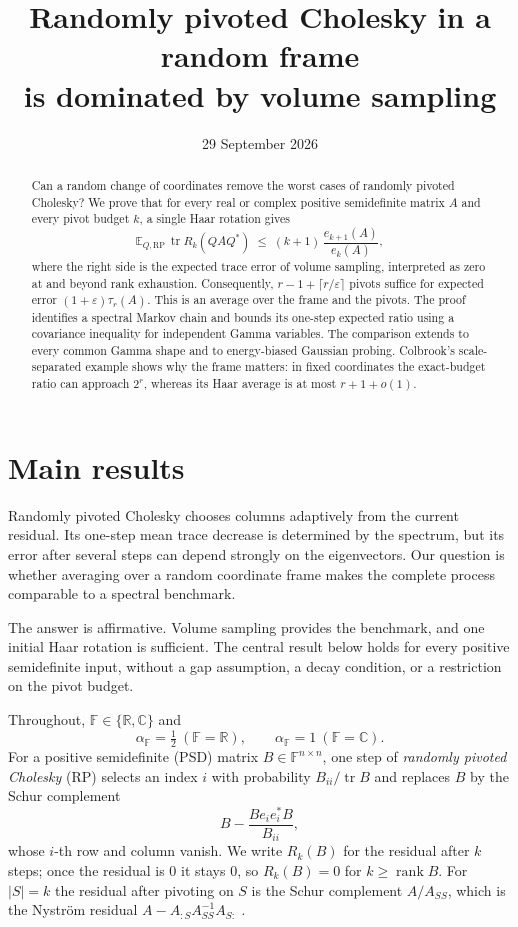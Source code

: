 \documentclass[11pt,a4paper]{article}
\title{Randomly pivoted Cholesky in a random frame\\ is dominated by volume sampling}
\author{}
\date{29 September 2026}
\theoremstyle{definition}
\newcommand{\E}{\mathbb{E}}
\newcommand{\R}{\mathbb{R}}
\newcommand{\C}{\mathbb{C}}
\newcommand{\F}{\mathbb{F}}
\newcommand{\tr}{\operatorname{tr}}
\newcommand{\rank}{\operatorname{rank}}
\newcommand{\RP}{\mathrm{RP}}
\begin{document}
\maketitle

\begin{abstract}
Can a random change of coordinates remove the worst cases of randomly pivoted Cholesky? We prove that for every real or complex positive semidefinite matrix $A$ and every pivot budget $k$, a single Haar rotation gives
\[
\E_{Q,\RP}\,\tr R_k(QAQ^*)\;\le\;(k+1)\,\frac{e_{k+1}(A)}{e_k(A)},
\]
where the right side is the expected trace error of volume sampling, interpreted as zero at and beyond rank exhaustion. Consequently, $r-1+\lceil r/\varepsilon\rceil$ pivots suffice for expected error $(1+\varepsilon)\tau_r(A)$. This is an average over the frame and the pivots. The proof identifies a spectral Markov chain and bounds its one-step expected ratio using a covariance inequality for independent Gamma variables. The comparison extends to every common Gamma shape and to energy-biased Gaussian probing. Colbrook's scale-separated example shows why the frame matters: in fixed coordinates the exact-budget ratio can approach $2^r$, whereas its Haar average is at most $r+1+o(1)$.
\end{abstract}

\tableofcontents
\clearpage
\section{Main results}\label{sec:main}

Randomly pivoted Cholesky chooses columns adaptively from the current residual. Its one-step mean trace decrease is determined by the spectrum, but its error after several steps can depend strongly on the eigenvectors. Our question is whether averaging over a random coordinate frame makes the complete process comparable to a spectral benchmark.

The answer is affirmative. Volume sampling provides the benchmark, and one initial Haar rotation is sufficient. The central result below holds for every positive semidefinite input, without a gap assumption, a decay condition, or a restriction on the pivot budget.

Throughout, $\F\in\{\R,\C\}$ and
\[
\alpha_\F=\tfrac12\ (\F=\R),\qquad \alpha_\F=1\ (\F=\C).
\]
For a positive semidefinite (PSD) matrix $B\in\F^{n\times n}$, one step of \emph{randomly pivoted Cholesky} (RP) selects an index $i$ with probability $B_{ii}/\tr B$ and replaces $B$ by the Schur complement
\[
B-\frac{Be_ie_i^*B}{B_{ii}},
\]
whose $i$-th row and column vanish. We write $R_k(B)$ for the residual after $k$ steps; once the residual is $0$ it stays $0$, so $R_k(B)=0$ for $k\ge\rank B$. For $|S|=k$ the residual after pivoting on $S$ is the Schur complement $A/A_{SS}$, which is the Nystr\"om residual $A-A_{:S}A_{SS}^{-1}A_{S:}$ \cite{CETW}.
\end{document}
